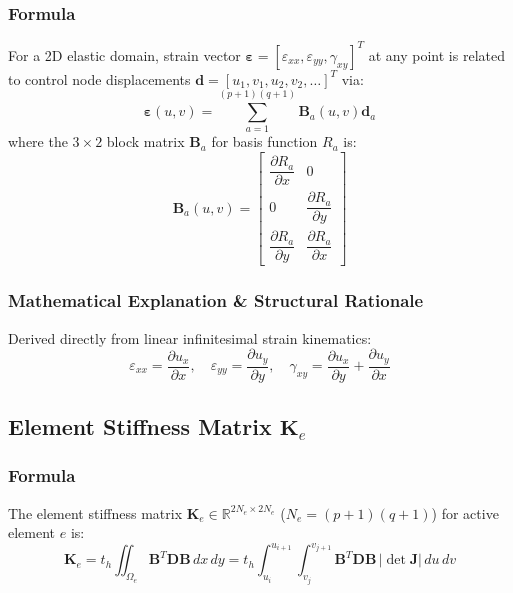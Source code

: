 \subsubsection{Formula}
For a 2D elastic domain, strain vector $\boldsymbol{\varepsilon} = [\varepsilon_{xx}, \varepsilon_{yy}, \gamma_{xy}]^T$ at any point is related to control node displacements $\mathbf{d} = [u_1, v_1, u_2, v_2, \dots]^T$ via:
\begin{equation}
\boldsymbol{\varepsilon}(u, v) = \sum_{a=1}^{(p+1)(q+1)} \mathbf{B}_a(u, v) \mathbf{d}_a
\end{equation}
where the $3 \times 2$ block matrix $\mathbf{B}_a$ for basis function $R_a$ is:
\begin{equation}
\mathbf{B}_a(u, v) = \begin{bmatrix} 
\dfrac{\partial R_a}{\partial x} & 0 \\[8pt] 
0 & \dfrac{\partial R_a}{\partial y} \\[8pt] 
\dfrac{\partial R_a}{\partial y} & \dfrac{\partial R_a}{\partial x} 
\end{bmatrix}
\end{equation}

\subsubsection{Mathematical Explanation \& Structural Rationale}
Derived directly from linear infinitesimal strain kinematics:
\begin{equation}
\varepsilon_{xx} = \frac{\partial u_x}{\partial x}, \quad 
\varepsilon_{yy} = \frac{\partial u_y}{\partial y}, \quad 
\gamma_{xy} = \frac{\partial u_x}{\partial y} + \frac{\partial u_y}{\partial x}
\end{equation}

\hr

\subsection{Element Stiffness Matrix $\mathbf{K}_e$}

\subsubsection{Formula}
The element stiffness matrix $\mathbf{K}_e \in \mathbb{R}^{2N_e \times 2N_e}$ ($N_e = (p+1)(q+1)$) for active element $e$ is:
\begin{equation}
\mathbf{K}_e = t_h \iint_{\Omega_e} \mathbf{B}^T \mathbf{D} \mathbf{B} \, dx \, dy = t_h \int_{u_i}^{u_{i+1}} \int_{v_j}^{v_{j+1}} \mathbf{B}^T \mathbf{D} \mathbf{B} \, |\det \mathbf{J}| \, du \, dv
\end{equation}

